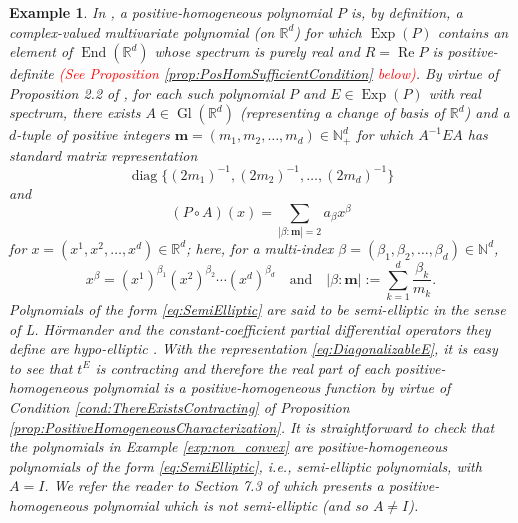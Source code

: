 \documentclass[11pt]{article}
\newtheorem{example}{Example}
\renewcommand\Re{\operatorname{Re}}%
\newcommand\End{\operatorname{End}} %
\newcommand\Gl{\operatorname{Gl}} %
\newcommand\Exp{\operatorname{Exp}}
\newcommand\diag{\operatorname{diag}}
\begin{document}
\begin{example}\label{exp:Polynomial}\normalfont
 In \cite{Randles2017}, a positive-homogeneous polynomial $P$ is, by definition, a complex-valued multivariate polynomial (on $\mathbb{R}^d$) for which $\Exp(P)$ contains an element of $\End(\mathbb{R}^d)$ whose spectrum is purely real and $R=\Re P$ is positive-definite \textcolor{red}{(See Proposition \ref{prop:PosHomSufficientCondition} below)}. By virtue of Proposition 2.2 of \cite{Randles2017}, for each such polynomial $P$ and $E\in\Exp(P)$ with real spectrum, there exists $A\in\Gl(\mathbb{R}^d)$ (representing a change of basis of $\mathbb{R}^d$) and a $d$-tuple of positive integers $\mathbf{m}=(m_1,m_2,\dots,m_d)\in\mathbb{N}_+^d$ for which $A^{-1}EA$ has standard matrix representation
\begin{equation}\label{eq:DiagonalizableE}
\diag\{(2m_1)^{-1},(2m_2)^{-1},\dots,(2m_d)^{-1}\}
\end{equation}
and
\begin{equation}\label{eq:SemiElliptic}
(P\circ A)(x)=\sum_{|\beta:\mathbf{m}|=2}a_\beta x^\beta
\end{equation}
for $x=(x^1,x^2,\dots,x^d)\in\mathbb{R}^d$; here, for a multi-index $\beta=(\beta_1,\beta_2,\dots,\beta_d)\in\mathbb{N}^d$,
\begin{equation*}
x^{\beta}=(x^1)^{\beta_1}(x^2)^{\beta_2}\cdots (x^d)^{\beta_d} \quad \mbox{and} \quad |\beta:\mathbf{m}|:=\sum_{k=1}^d\frac{\beta_k}{m_k}.
\end{equation*}
Polynomials of the form \eqref{eq:SemiElliptic} are said to be semi-elliptic in the sense of L. H\"{o}rmander and the constant-coefficient partial differential operators they define are hypo-elliptic \cite{Hormander1983}. With the representation \eqref{eq:DiagonalizableE}, it is easy to see that $t^{E}$ is contracting and therefore the real part of each positive-homogeneous polynomial is a positive-homogeneous function by virtue of Condition \ref{cond:ThereExistsContracting} of Proposition \ref{prop:PositiveHomogeneousCharacterization}. It is straightforward to check that the polynomials in Example \ref{exp:non_convex} are positive-homogeneous polynomials of the form \eqref{eq:SemiElliptic}, i.e., semi-elliptic polynomials, with $A=I$. We refer the reader to Section 7.3 of \cite{Randles2017} which presents a positive-homogeneous polynomial which is not semi-elliptic (and so $A\neq I$).
\end{example}
\end{document}

